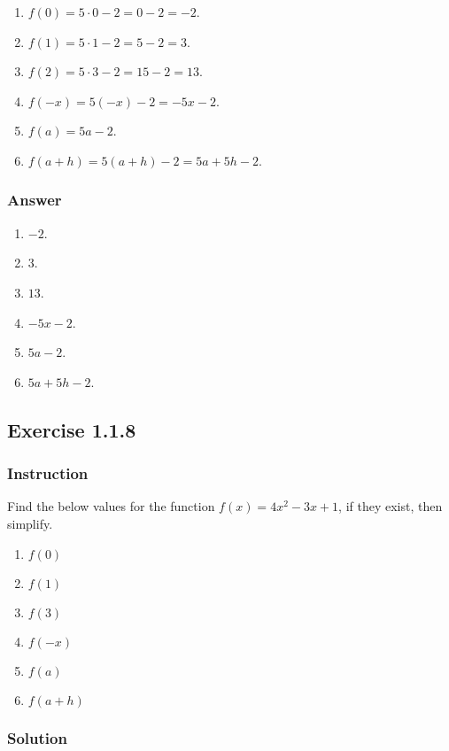 \documentclass[11pt, letterpaper, oneside]{memoir}
\begin{document}
\begin{enumerate}[label=(\alph*)]
  \item $ f(0) = 5 \cdot 0 - 2 = 0 - 2 = -2 $.
  \item $ f(1) = 5 \cdot 1 - 2 = 5 - 2 = 3 $.
  \item $ f(2) = 5 \cdot 3 - 2 = 15 - 2 = 13 $.
  \item $ f(-x) = 5(-x) - 2 = -5x - 2 $.
  \item $ f(a) = 5a - 2 $.
  \item $ f(a + h) = 5(a + h) - 2 = 5a + 5h - 2 $.
\end{enumerate}

\subsubsection{Answer}

\begin{enumerate}[label=(\alph*)]
  \item $ -2 $.
  \item $ 3 $.
  \item $ 13 $.
  \item $ -5x - 2 $.
  \item $ 5a - 2 $.
  \item $ 5a + 5h - 2$.
\end{enumerate}

\subsection*{Exercise 1.1.8}

\subsubsection{Instruction}

Find the below values for the function $ f(x) = 4x^2 - 3x + 1 $, if they exist, then simplify.
\begin{enumerate}[label=(\alph*)]
  \item $ f(0) $
  \item $ f(1) $
  \item $ f(3) $
  \item $ f(-x) $
  \item $ f(a) $
  \item $ f(a + h) $
\end{enumerate}

\subsubsection{Solution}
\end{document}

